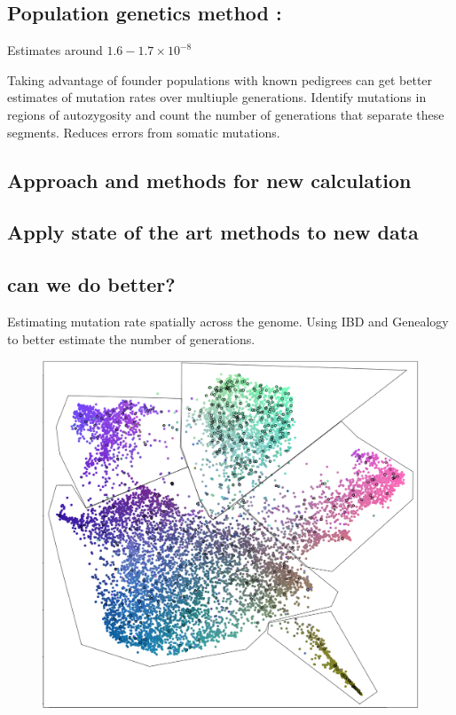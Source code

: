 \documentclass[
11pt, %
oneside, %
english, %
doublespacing, %
headsepline, %
]{MastersDoctoralThesis} %
\begin{document}
\subsection{Population genetics method : }
Estimates around $1.6-1.7\times10^{-8}$

Taking advantage of founder populations with known pedigrees can get better estimates of mutation rates over multiuple generations.
Identify mutations in regions of autozygosity and count the number of generations that separate these segments. 
Reduces errors from somatic mutations. 
\subsection{Approach and methods for new calculation}

\subsection{Apply state of the art methods to new data}

\subsection{can we do better?}
Estimating mutation rate spatially across the genome.
Using IBD and Genealogy to better estimate the number of generations.


\appendix %

\begin{figure}
\includegraphics[width=\hsize,keepaspectratio]{./Figures/5Clusters.png}
\label{Cluster}
\end{figure}
\end{document}
